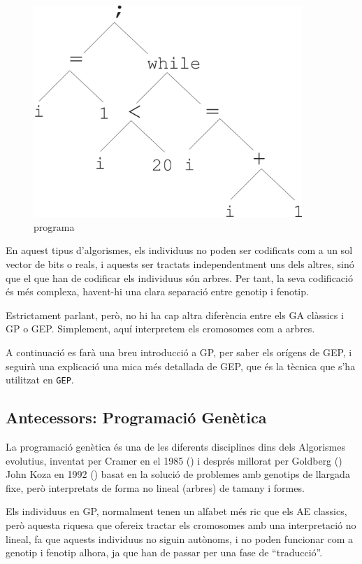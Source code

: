\documentclass[titlepage,a4paper,12pt]{book}
\begin{document}
\begin{figure} \centering \includegraphics[width=4in]{intro/6-3.jpg}
\caption{\label{fig:6-3}programa}
\end{figure}
En aquest tipus d'algorismes, els individuus no poden ser codificats com a un
sol vector de bits o reals, i aquests ser tractats independentment uns dels
altres, sinó que el que han de codificar els individuus són arbres.  Per tant,
la seva codificació és més complexa, havent-hi una clara separació entre genotip
i fenotip.

Estrictament parlant, però, no hi ha cap altra diferència entre els GA clàssics
i GP o GEP.  Simplement, aquí interpretem els cromosomes com a arbres.

A continuació es farà una breu introducció a GP, per saber els orígens de
GEP, i seguirà una explicació una mica més detallada de GEP, que és la tècnica
que s'ha utilitzat en \texttt{GEP}.

\subsection{Antecessors: Programació Genètica} %
\label{sub:Ant. Programacio Genetica}
La programació genètica és una de les diferents disciplines dins dels Algorismes
evolutius, inventat per Cramer en el 1985 (\cite{C85}) i després millorat per
Goldberg (\cite{Goldberg:89})
John Koza en 1992 (\cite{koza:92}) basat en la solució de problemes amb genotips de
llargada fixe, però interpretats de forma no lineal (arbres) de tamany i formes.

Els individuus en GP, normalment tenen un alfabet més ric que els AE classics,
però aquesta riquesa que ofereix tractar els cromosomes amb una interpretació
no lineal, fa que aquests individuus no siguin autònoms, i no poden funcionar
com a genotip i fenotip alhora, ja que han de passar per una fase de
``traducció''.
\end{document}
